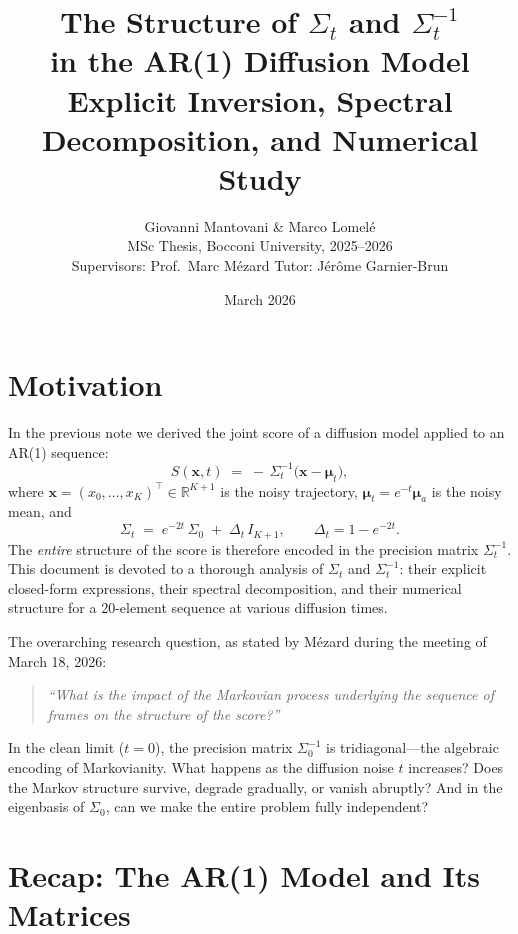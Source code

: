 \documentclass[11pt,a4paper]{article}
\title{\bfseries The Structure of $\Sigma_t$ and $\Sigma_t^{-1}$\\[4pt]
in the AR(1) Diffusion Model\\[6pt]
\large Explicit Inversion, Spectral Decomposition, and Numerical Study}
\author{Giovanni Mantovani \& Marco Lomel\'e\\[2pt]
\small MSc Thesis, Bocconi University, 2025--2026\\
\small Supervisors: Prof.\ Marc M\'ezard \quad Tutor: J\'er\^ome Garnier-Brun}
\date{March 2026}
\newcommand{\R}{\mathbb{R}}
\newcommand{\Dt}{\Delta_t}
\begin{document}
\maketitle
\tableofcontents
\newpage

\section{Motivation}

In the previous note we derived the joint score of a diffusion model applied to an AR(1) sequence:
\begin{equation}\label{eq:score-main}
  S(\mathbf{x}, t) \;=\; -\,\Sigma_t^{-1}\bigl(\mathbf{x} - \bm{\mu}_t\bigr),
\end{equation}
where $\mathbf{x} = (x_0, \dots, x_K)^\top \in \R^{K+1}$ is the noisy trajectory, $\bm{\mu}_t = e^{-t}\bm{\mu}_a$ is the noisy mean, and
\begin{equation}\label{eq:sigma-t-def}
  \Sigma_t \;=\; e^{-2t}\,\Sigma_0 \;+\; \Dt\, I_{K+1}, \qquad \Dt = 1 - e^{-2t}.
\end{equation}
The \emph{entire} structure of the score is therefore encoded in the precision matrix $\Sigma_t^{-1}$.  This document is devoted to a thorough analysis of $\Sigma_t$ and $\Sigma_t^{-1}$: their explicit closed-form expressions, their spectral decomposition, and their numerical structure for a 20-element sequence at various diffusion times.

The overarching research question, as stated by M\'ezard during the meeting of March 18, 2026:

\begin{quote}
\emph{``What is the impact of the Markovian process underlying the sequence of frames on the structure of the score?''}
\end{quote}

In the clean limit ($t = 0$), the precision matrix $\Sigma_0^{-1}$ is tridiagonal---the algebraic encoding of Markovianity.  What happens as the diffusion noise $t$ increases?  Does the Markov structure survive, degrade gradually, or vanish abruptly?  And in the eigenbasis of $\Sigma_0$, can we make the entire problem fully independent?

\section{Recap: The AR(1) Model and Its Matrices}
\label{sec:recap}
\end{document}
